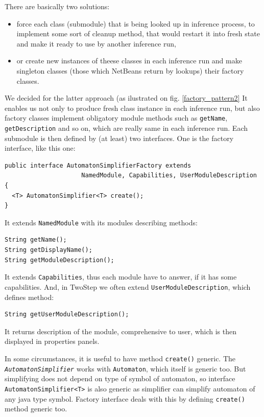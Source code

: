\documentclass[a4paper,10pt,oneside]{article}
\newcommand{\code}[1]{\texttt{#1}}
\newcommand{\jmodule}[1]{\texttt{\textsl{#1}}}
\begin{document}
There are basically two solutions:
\begin{itemize}
	\item force each class (submodule) that is being looked up in inference process, to implement
some sort of cleanup method, that would restart it into fresh state and make it ready to use by another 
inference run,
	\item or create new instances of theese classes in each inference run and make singleton classes (those which NetBeans return by lookups) their factory classes.
\end{itemize}
We decided for the latter approach (as ilustrated on fig. \ref{factory_pattern2}
It enables us not only to produce fresh class instance in each inference run, but also factory classes implement obligatory
module methods such as \code{getName}, \code{getDescription} and so on, which are really same in each inference run.
Each submodule is then defined by (at least) two interfaces.
One is the factory interface, like this one:
\begin{verbatim}
public interface AutomatonSimplifierFactory extends 
                     NamedModule, Capabilities, UserModuleDescription {
  <T> AutomatonSimplifier<T> create();
}
\end{verbatim}
It extends \code{NamedModule} with its modules describing methods:
\begin{verbatim}
String getName();
String getDisplayName();
String getModuleDescription();
\end{verbatim}
It extends \code{Capabilities}, thus each module have to answer, if it has some capabilities.
And, in TwoStep we often extend \code{UserModuleDescription}, which defines method:
\begin{verbatim}
String getUserModuleDescription();
\end{verbatim}
It returns description of the module, comprehensive to user, which is then displayed in properties panels.

In some circumstances, it is useful to have method \code{create()} generic.
The \jmodule{AutomatonSimplifier} works with \code{Automaton}, which itself is generic too.
But simplifying does not depend on type of symbol of automaton, so interface \code{AutomatonSimplifier<T>}
is also generic as simplifier can simplify automaton of any java type symbol.
Factory interface deals with this by defining \code{create()} method generic too.
\end{document}
